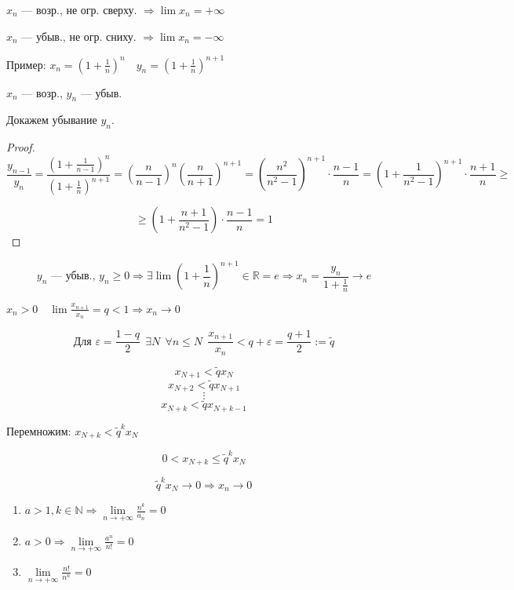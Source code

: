 \begin{remark}
    $x_n$ --- возр., не огр. сверху. $\Rightarrow \lim x_n=+\infty$

    $x_n$ --- убыв., не огр. сниху. $\Rightarrow \lim x_n=-\infty$
\end{remark}

Пример: $x_n=(1+\frac{1}{n})^n \quad y_n=(1+\frac{1}{n})^{n+1}$

$x_n$ --- возр., $y_n$ --- убыв.

Докажем убывание $y_n$.

\begin{proof}
    $$\frac{y_{n-1}}{y_n}=\frac{(1+\frac{1}{n-1})^n}{(1+\frac{1}{n})^{n+1}}=(\frac{n}{n-1})^n(\frac{n}{n+1})^{n+1} = (\frac{n^2}{n^2-1})^{n+1}\cdot \frac{n-1}{n} = (1+\frac{1}{n^2-1})^{n+1}\cdot \frac{n+1}{n}\geq $$

    $$\geq (1+\frac{n+1}{n^2-1})\cdot \frac{n-1}{n}=1$$
\end{proof}

$$y_n \text{ --- убыв., } y_n\geq 0 \Rightarrow \exists\lim(1+\frac{1}{n})^{n+1}\in\mathbb{R}=e\Rightarrow x_n=\frac{y_n}{1+\frac{1}{n}}\to e$$

\begin{lemma}
    $x_n>0 \quad \lim\frac{x_{n+1}}{x_n}=q<1 \Rightarrow x_n\to 0$

    $$\text{Для } \varepsilon =\frac{1-q}{2} \ \ \exists N \ \ \forall n\leq N \ \ \frac{x_{n+1}}{x_n}<q+\varepsilon=\frac{q+1}{2}:=\tilde q$$

    $$x_{N+1}<\tilde q x_{N}$$
    $$x_{N+2}<\tilde q x_{N+1}$$
    $$\vdots$$
    $$x_{N+k}<\tilde q x_{N+k-1}$$

    Перемножим: $x_{N+k}<\tilde q^kx_N$

    $$0<x_{N+k}\leq \tilde q^kx_N$$

    $$\tilde q^kx_N\to 0 \Rightarrow x_n\to 0$$
\end{lemma}

\begin{consequence}
    \begin{enumerate}
        \item $a>1,k\in\mathbb{N} \Rightarrow \lim\limits_{n\to+\infty}\frac{n^k}{a_n}=0$
        \item $a>0 \Rightarrow \lim\limits_{n\to+\infty}\frac{a^n}{n!}=0$
        \item $\lim\limits_{n\to+\infty} \frac{n!}{n^n}=0$
    \end{enumerate}
\end{consequence}

